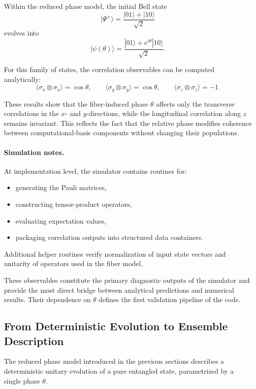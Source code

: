 \documentclass[a4paper]{article}
\begin{document}
Within the reduced phase model, the initial Bell state
\[
|\Psi^+\rangle = \frac{|01\rangle + |10\rangle}{\sqrt{2}}
\]
evolves into
\[
|\psi(\theta)\rangle
=
\frac{|01\rangle + e^{i\theta}|10\rangle}{\sqrt{2}}.
\]

For this family of states, the correlation observables can be computed analytically:
\[
\langle \sigma_x \otimes \sigma_x \rangle = \cos\theta,
\qquad
\langle \sigma_y \otimes \sigma_y \rangle = \cos\theta,
\qquad
\langle \sigma_z \otimes \sigma_z \rangle = -1.
\]

These results show that the fiber-induced phase \(\theta\) affects only the transverse correlations in the \(x\)- and \(y\)-directions, while the longitudinal correlation along \(z\) remains invariant. This reflects the fact that the relative phase modifies coherence between computational-basis components without changing their populations.

\paragraph{Simulation notes.}
At implementation level, the simulator contains routines for:
\begin{itemize}
    \item generating the Pauli matrices,
    \item constructing tensor-product operators,
    \item evaluating expectation values,
    \item packaging correlation outputs into structured data containers.
\end{itemize}

Additional helper routines verify normalization of input state vectors and unitarity of operators used in the fiber model.

These observables constitute the primary diagnostic outputs of the simulator and provide the most direct bridge between analytical predictions and numerical results. Their dependence on \(\theta\) defines the first validation pipeline of the code.

\subsection{From Deterministic Evolution to Ensemble Description}

The reduced phase model introduced in the previous sections describes a deterministic unitary evolution of a pure entangled state, parametrized by a single phase \(\theta\).
\end{document}
